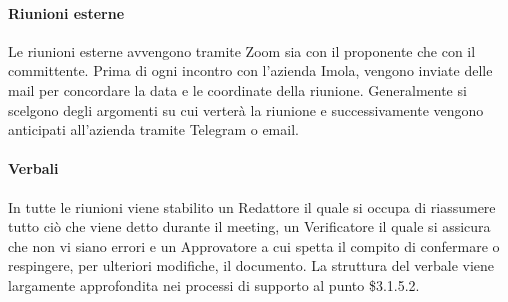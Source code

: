\paragraph{Riunioni esterne} \hfill \break
Le riunioni esterne avvengono tramite Zoom sia con il proponente che con il committente. Prima di ogni incontro con 
l'azienda Imola, vengono inviate delle mail per concordare la data e le coordinate della riunione. Generalmente si scelgono
degli argomenti su cui verterà la riunione e successivamente vengono anticipati all'azienda tramite Telegram o email.

\paragraph{Verbali} \hfill \break
In tutte le riunioni viene stabilito un Redattore il quale si occupa di riassumere tutto ciò che
viene detto durante il meeting, un Verificatore il quale si assicura che non vi siano errori e un Approvatore
a cui spetta il compito di confermare o respingere, per ulteriori modifiche, il documento. La struttura del verbale viene 
largamente approfondita nei processi di supporto al punto \$3.1.5.2.